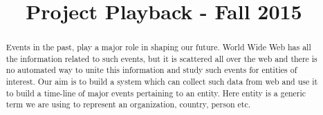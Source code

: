 \documentclass[10pt,conference]{IEEEtran}
\begin{document}
\title{Project Playback - Fall 2015}
\author{
\and
{}
\and
{}
}

\maketitle
\begin{abstract}
\textnormal{
Events in the past, play a major role in shaping our future. World Wide Web has all the information related to such events, but it is scattered all over the web and there is no automated way to unite this information and study such events for entities of interest. Our aim is to build a system which can collect such data from web and use it to build a time-line of major events pertaining to an entity. Here entity is a generic term we are using to represent an organization, country, person etc.
}
\end{abstract}

\IEEEpeerreviewmaketitle
\end{document}

